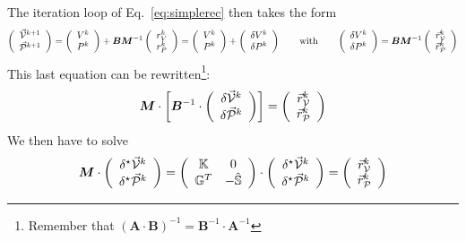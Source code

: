 The iteration loop of Eq.~\eqref{eq:simplerec} then takes the form 
\[
\left(
\begin{array}{c}
\vec{\cal V}^{k+1} \\ 
\vec{\cal P}^{k+1}
\end{array}
\right)
=
\left(
\begin{array}{c}
V^k \\ P^k
\end{array}
\right)
+ 
{\bm B}  {\bm M} ^{-1}
\left(
\begin{array}{c}
r_V^k \\ r_P^k
\end{array}
\right)
=
\left(
\begin{array}{c}
V^k \\ P^k
\end{array}
\right)
+ 
\left(
\begin{array}{c}
\delta V^k \\ \delta P^k
\end{array}
\right)
\quad\quad
\textrm{with}\quad\quad
\left(
\begin{array}{c}
\delta V^k \\ \delta P^k
\end{array}
\right)
=
{\bm B}  {\bm M} ^{-1}
\left(
\begin{array}{c}
\vec{r}_{\cal V}^k \\ 
\vec{r}_{\cal P}^k
\end{array}
\right)
\]
This last equation can be rewritten\footnote{Remember 
that $({\bm A}\cdot {\bm B})^{-1}={\bm B}^{-1}\cdot {\bm A}^{-1}$}:
\[
{\bm M} \cdot 
\left[ {\bm B}^{-1} \cdot 
\left(
\begin{array}{c}
\delta \vec{\cal V}^k \\ 
\delta \vec{\cal P}^k
\end{array}
\right)
\right]
=
\left(
\begin{array}{c}
\vec{r}_{\cal V}^k \\ 
\vec{r}_{\cal P}^k
\end{array}
\right)
\]
We then have to solve 
\begin{equation}
{\bm M} 
\cdot
\left(
\begin{array}{c}
\delta^\star \vec{\cal V}^k \\ 
\delta^\star \vec{\cal P}^k
\end{array}
\right)
=
\left(
\begin{array}{cc}
{\mathbb{K}} & 0 \\
{\mathbb{G}}^T & -\hat{{\mathbb{S}}}
\end{array}
\right)
\cdot
\left(
\begin{array}{c}
\delta^\star \vec{\cal V}^k \\ 
\delta^\star \vec{\cal P}^k
\end{array}
\right)
=
\left(
\begin{array}{c}
\vec{r}_{\cal V}^k \\ 
\vec{r}_{\cal P}^k
\end{array}
\right)
\label{simple1aa}
\end{equation}
